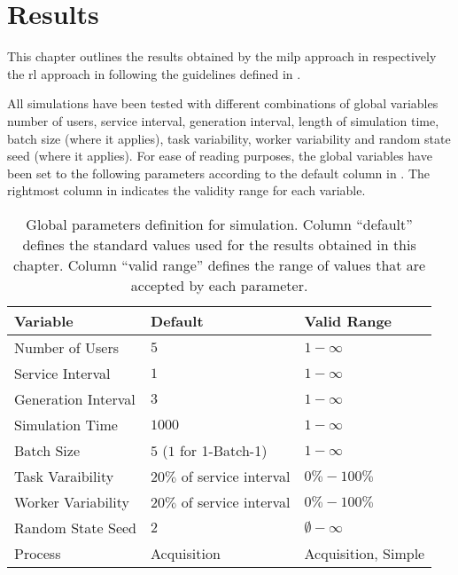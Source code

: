 \chapter{Results}
\label{ch:results}

This chapter outlines the results obtained by the \gls{milp} approach in  respectively the \gls{rl} approach in  following the guidelines defined in .

All simulations have been tested with different combinations of global variables \ie number of users, service interval, generation interval, length of simulation time, batch size (where it applies), task variability, worker variability and random state seed (where it applies). For ease of reading purposes, the global variables have been set to the following parameters according to the default column in . The rightmost column in  indicates the validity range for each variable.

\begin{table}[!ht]
	\centering
		\begin{tabular}{@{}lll@{}}
		\toprule
		Variable            & Default     & Valid Range \\ \midrule
		Number of Users     & $5$           & $1-\infty$      \\
		Service Interval    & $1$           & $1-\infty$      \\
		Generation Interval & $3$           & $1-\infty$      \\
		Simulation Time     & $1000$          & $1-\infty$      \\
		Batch Size          & $5$ ($1$ for 1-Batch-1)           & $1-\infty$      \\
		Task Varaibility    & $20\%$ of service interval       & $0\%-100\%$      \\
		Worker Variability  & $20\%$ of service interval       & $0\%-100\%$      \\
		Random State Seed   & $2$           & $\emptyset-\infty$      \\
		Process    & Acquisition & Acquisition, Simple      \\ \bottomrule
		\end{tabular}
	\caption{Global parameters definition for simulation. Column ``default'' defines the standard values used for the results obtained in this chapter. Column ``valid range'' defines the range of values that are accepted by each parameter.}
	\label{tab:global_parameters_sim}
\end{table}

